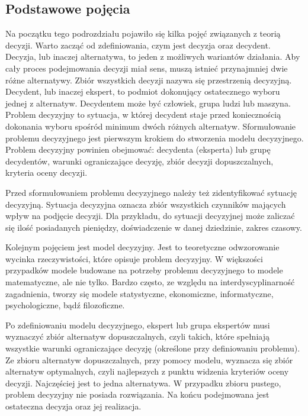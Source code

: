 \subsection{Podstawowe pojęcia}
Na początku tego podrozdziału pojawiło się kilka pojęć związanych z teorią 
decyzji. Warto zacząć od zdefiniowania, czym jest decyzja oraz decydent.
Decyzja, lub inaczej alternatywa, to jeden z możliwych wariantów działania. Aby
cały proces podejmowania decyzji miał sens, muszą istnieć przynajmniej dwie
różne alternatywy. Zbiór wszystkich decyzji nazywa się przestrzenią decyzyjną. 
Decydent, lub inaczej ekspert, to podmiot dokonujący ostatecznego wyboru jednej 
z alternatyw. Decydentem może być człowiek, grupa ludzi lub maszyna. Problem 
decyzyjny to sytuacja, w której decydent staje przed koniecznością dokonania 
wyboru spośród minimum dwóch różnych alternatyw. Sformułowanie problemu 
decyzyjnego jest pierwszym krokiem do stworzenia modelu decyzyjnego. Problem 
decyzyjny powinien obejmować: decydenta (eksperta) lub grupę decydentów, 
warunki ograniczające decyzję, zbiór decyzji dopuszczalnych, kryteria oceny 
decyzji.

Przed sformułowaniem problemu decyzyjnego należy też zidentyfikować sytuację 
decyzyjną. Sytuacja decyzyjna oznacza zbiór wszystkich czynników mających wpływ 
na podjęcie decyzji. Dla przykładu, do sytuacji decyzyjnej może zaliczać się 
ilość posiadanych pieniędzy, doświadczenie w danej dziedzinie, zakres czasowy.

Kolejnym pojęciem jest model decyzyjny. Jest to teoretyczne odwzorowanie 
wycinka rzeczywistości, które opisuje problem decyzyjny. W większości 
przypadków modele budowane na potrzeby problemu decyzyjnego to modele 
matematyczne, ale nie tylko. Bardzo często, ze względu na interdyscyplinarność 
zagadnienia, tworzy się modele statystyczne, ekonomiczne, informatyczne, 
psychologiczne, bądź filozoficzne.

Po zdefiniowaniu modelu decyzyjnego, ekspert lub grupa ekspertów musi wyznaczyć 
zbiór alternatyw dopuszczalnych, czyli takich, które spełniają wszystkie warunki
ograniczające decyzję (określone przy definiowaniu problemu). Ze zbioru 
alternatyw dopuszczalnych, przy pomocy modelu, wyznacza się zbiór alternatyw 
optymalnych, czyli najlepszych z punktu widzenia kryteriów oceny decyzji.
Najczęściej jest to jedna alternatywa. W przypadku zbioru pustego, problem 
decyzyjny nie posiada rozwiązania. Na końcu podejmowana jest ostateczna decyzja 
oraz jej realizacja.

